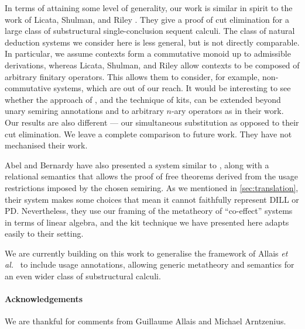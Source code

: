 \documentclass[submission,copyright,creativecommons]{eptcs}
\begin{document}
In terms of attaining some level of generality, our work is similar in spirit to the work of Licata, Shulman, and
Riley \cite{LicataSR17}. They give a proof of cut elimination for a
large class of substructural single-conclusion sequent calculi.
The class of natural deduction systems we consider here is less
general, but is not directly comparable.
In particular, we assume contexts form a commutative monoid up to admissible
derivations, whereas Licata, Shulman, and Riley allow contexts to be composed
of arbitrary finitary operators. This allows them to consider, for example, non-commutative systems, which are out of our reach. It would be interesting to see whether the approach of \name{}, and the technique of kits, can be extended beyond unary semiring annotations and to arbitrary $n$-ary operators as in their work.
Our results are also different --- our simultaneous substitution as opposed to
their cut elimination.
We leave a complete comparison to future work.
They have not mechanised their work.

Abel and Bernardy \cite{AbelBernardy2020} have also presented a system
similar to \name{}, along with a relational semantics that allows the
proof of free theorems derived from the usage restrictions imposed by
the chosen semiring. As we mentioned in \autoref{sec:translation},
their system makes some choices that mean it cannot faithfully
represent DILL or PD. Nevertheless, they use our framing of the
metatheory of ``co-effect'' systems in terms of linear algebra, and
the kit technique we have presented here adapts easily to their
setting.

We are currently building on this work to generalise the framework of Allais
\emph{et al.}~\cite{AACMM20} to include usage annotations, allowing
generic metatheory and semantics for an even wider class of
substructural calculi.

\paragraph{Acknowledgements}
We are thankful for comments from Guillaume Allais and Michael Arntzenius.



\end{document}
